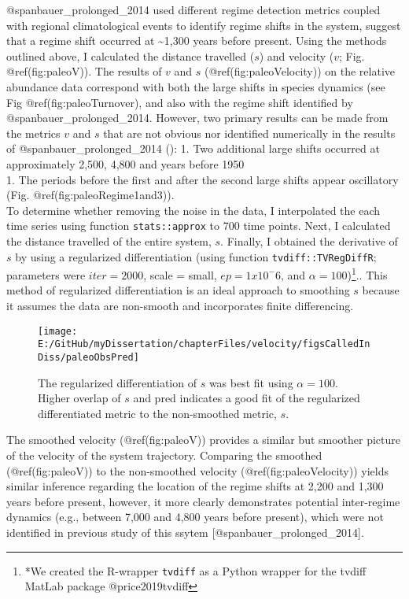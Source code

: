 \documentclass[]{article}
\let\rmarkdownfootnote\footnote%
\def\footnote{\protect\rmarkdownfootnote}
\begin{document}
@spanbauer\_prolonged\_2014 used different regime detection metrics
coupled with regional climatological events to identify regime shifts in
the system, suggest that a regime shift occurred at
\textasciitilde{}1,300 years before present. Using the methods outlined
above, I calculated the distance travelled (\(s\)) and velocity (\(v\);
Fig. @ref(fig:paleoV)). The results of \(v\) and \(s\)
(@ref(fig:paleoVelocity)) on the relative abundance data correspond with
both the large shifts in species dynamics (see Fig
@ref(fig:paleoTurnover), and also with the regime shift identified by
@spanbauer\_prolonged\_2014. However, two primary results can be made
from the metrics \(v\) and \(s\) that are not obvious nor identified
numerically in the results of @spanbauer\_prolonged\_2014 (): 1. Two
additional large shifts occurred at approximately 2,500, 4,800 and years
before 1950\\
1. The periods before the first and after the second large shifts appear
oscillatory (Fig. @ref(fig:paleoRegime1and3)).\\
To determine whether removing the noise in the data, I interpolated the
each time series using function \texttt{stats::approx} to 700 time
points. Next, I calculated the distance travelled of the entire system,
\(s\). Finally, I obtained the derivative of \(s\) by using a
regularized differentiation (using function \texttt{tvdiff::TVRegDiffR};
parameters were \(iter = 2000\), scale = small, \(ep = 1 x 10^-6\), and
\(\alpha = 100\))\footnote{*We created the R-wrapper \texttt{tvdiff} as
  a Python wrapper for the tvdiff MatLab package @price2019tvdiff}..
This method of regularized differentiation is an ideal approach to
smoothing \(s\) because it assumes the data are non-smooth and
incorporates finite differencing.

\begin{figure}

{\centering \texttt{[image: E:/GitHub/myDissertation/chapterFiles/velocity/figsCalledInDiss/paleoObsPred]} 

}

\caption{The regularized differentiation of $s$ was best fit using $\alpha = 100$. Higher overlap of $s$ and pred indicates a good fit of the regularized differentiated metric to the non-smoothed metric, $s$.}\label{fig:paleoObsPred}
\end{figure}

The smoothed velocity (@ref(fig:paleoV)) provides a similar but smoother
picture of the velocity of the system trajectory. Comparing the smoothed
(@ref(fig:paleoV)) to the non-smoothed velocity
(@ref(fig:paleoVelocity)) yields similar inference regarding the
location of the regime shifts at 2,200 and 1,300 years before present,
however, it more clearly demonstrates potential inter-regime dynamics
(e.g., between 7,000 and 4,800 years before present), which were not
identified in previous study of this ssytem
{[}@spanbauer\_prolonged\_2014{]}.
\end{document}
